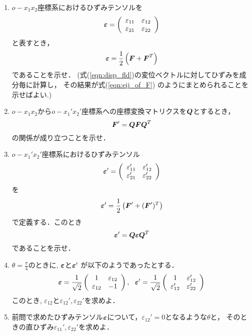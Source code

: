 \documentclass[10pt,a4j]{jarticle}
\begin{document}
\begin{enumerate}
\item
	$o-x_1x_2$座標系におけるひずみテンソルを
	\[
	\mbox{\boldmath $\varepsilon$}
	=
	\left(
	\begin{array}{cc}
		\varepsilon_{11} & \varepsilon_{12} \\
		\varepsilon_{21} & \varepsilon_{22} 
	\end{array}
	\right)
	\]
	と表すとき，
	\begin{equation}
		\mbox{\boldmath $\varepsilon$} = 
		\frac{1}{2} \left(
			\mbox{\boldmath $F$}+\mbox{\boldmath $F$}^T
		\right)
		\label{eqn:eij_of_F}
	\end{equation}
	であることを示せ．
	{\small
	(式(\ref{eqn:disp_fld})の変位ベクトルに対してひずみを成分毎に計算し，
	その結果が式(\ref{eqn:eij_of_F})
	のようにまとめられることを示せばよい.)}
\item
	$o-x_1x_2$から$o-x_1'x_2'$座標系への座標変換マトリクスを$\mbox{\boldmath $Q$}$とするとき，
	\[\mbox{\boldmath $F$}'=\mbox{\boldmath $Q$}\mbox{\boldmath $F$}\mbox{\boldmath $Q$}^T\]		
	の関係が成り立つことを示せ．
\item
	$o-x_1'x_2'$座標系におけるひずみテンソル
	\[
		\mbox{\boldmath $\varepsilon$}' = 
		\left(
		\begin{array}{cc}
			\varepsilon_{11}' & \varepsilon_{12}' \\
			\varepsilon_{21}' & \varepsilon_{22}' 
		\end{array}
		\right)
	\]
	を
	\[
		\mbox{\boldmath $\varepsilon$}' 
		=
		\frac{1}{2} \left(
			\mbox{\boldmath $F$}'+(\mbox{\boldmath $F$}')^T
		\right)
	\]
	で定義する．このとき
	\begin{equation}
		\mbox{\boldmath $\varepsilon$}'=\mbox{\boldmath $Q$}\mbox{\boldmath $\varepsilon$}\mbox{\boldmath $Q$}^T
		\label{eqn:e2ed}
	\end{equation}		
	であることを示せ．
\item
	$\theta=\frac{\pi}{4}$のときに, $\mbox{\boldmath $\varepsilon$}$と$\mbox{\boldmath $\varepsilon$}'$
	が以下のようであったとする．
	\begin{equation}
		\fat{\varepsilon}=
		\frac{1}{\sqrt{2}}
		\left(
			\begin{array}{cc}
				1 & \varepsilon_{12} \\
				\varepsilon_{12} & -1 
			\end{array}
		\right)
		, \ \ 
		\fat{\varepsilon}'=
		\frac{1}{\sqrt{2}}
		\left(
			\begin{array}{cc}
				1 & \varepsilon_{12}' \\
				\varepsilon_{12}' & \varepsilon_{22}' 
			\end{array}
		\right)
	\end{equation}
	このとき, $\varepsilon_{12}$と$\varepsilon_{12}',\varepsilon_{22}'$を求めよ．
\item
	前問で求めたひずみテンソル$\mbox{\boldmath $\varepsilon$}$について，$\varepsilon_{12}'=0$となるような$\theta$と，
	そのときの直ひずみ$\varepsilon_{11}',\varepsilon_{22}'$を求めよ．
\end{enumerate}
\end{document}

